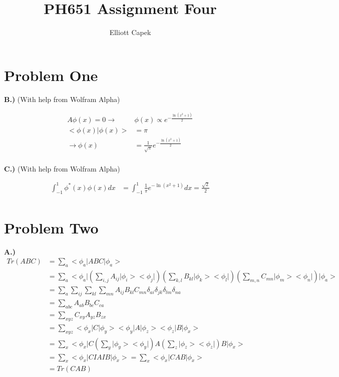 \documentclass[10pt]{article} %
\title{PH651 Assignment Four}
\author{Elliott Capek}
\newcommand{\bra}[1]{\big<#1\big|}
\newcommand{\ket}[1]{\big|#1\big>}
\newcommand{\braket}[2]{\big<#1\big|#2\big>}
\begin{document}
\maketitle{}

\section{Problem One}

\textbf{B.)}
(With help from Wolfram Alpha)

\begin{align*}
  A\phi(x) = 0 \rightarrow& \phi(x) \propto e^{-\frac{\ln(x^2+1)}{2}}\\
  \braket{\phi(x)}{\phi(x)} &= \pi\\
  \rightarrow \phi(x) &= \frac{1}{\sqrt{\pi}} e^{-\frac{\ln(x^2+1)}{2}}\\
\end{align*}

\textbf{C.)}
(With help from Wolfram Alpha)

\begin{align*}
  \int_{-1}^{1} \phi^*(x)\phi(x)dx &= \int_{-1}^{1} \frac{1}{\pi} e^{-\ln(x^2+1)}dx = \frac{\sqrt{2}}{2}\\
\end{align*}

\section{Problem Two}
\textbf{A.)}\\

\begin{align*}
  Tr(ABC) &= \sum_a \bra{\phi_a}ABC\ket{\phi_a}\\
  &= \sum_a \bra{\phi_a} \left(\sum_{i,j} A_{ij}\ket{\phi_i}\bra{\phi_j}\right)
  \left(\sum_{k,l} B_{kl}\ket{\phi_k}\bra{\phi_l}\right)
  \left(\sum_{m,n} C_{mn}\ket{\phi_m}\bra{\phi_n}\right)\ket{\phi_a}\\
  &= \sum_a \sum_{ij} \sum_{kl} \sum_{mn} A_{ij}B_{kl}C_{mn} \delta_{ai} \delta_{jk} \delta_{lm} \delta_{na}\\
  &= \sum_{abc} A_{ab}B_{bc}C_{ca}\\
  &= \sum_{xyz} C_{xy}A_{yz}B_{zx}\\
  &= \sum_{xyz} \bra{\phi_x}C\ket{\phi_y}\bra{\phi_y}A\ket{\phi_z}\bra{\phi_z}B\ket{\phi_x}\\
  &= \sum_{x} \bra{\phi_x}C\left(\sum_y\ket{\phi_y}\bra{\phi_y}\right)A\left(\sum_z\ket{\phi_z}\bra{\phi_z}\right)B\ket{\phi_x}\\
  &= \sum_{x} \bra{\phi_x}CIAIB\ket{\phi_x} = \sum_x \bra{\phi_x}CAB\ket{\phi_x}\\
  &= Tr(CAB)\\
\end{align*}
\end{document}
